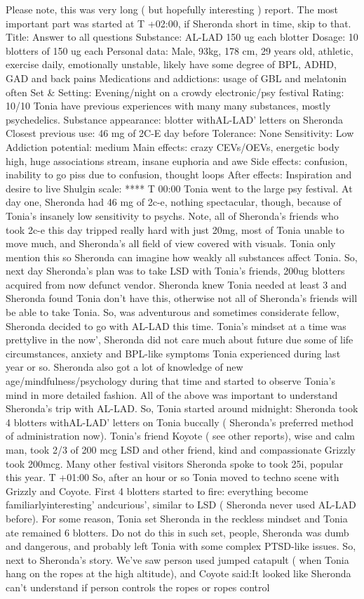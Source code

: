 \documentclass[12pt]{book}
\begin{document}
Please note, this was very long ( but hopefully interesting ) report. The most important part was started at T +02:00, if Sheronda short in time, skip to that. Title: Answer to all questions Substance: AL-LAD 150 ug each blotter Dosage: 10 blotters of 150 ug each Personal data: Male, 93kg, 178 cm, 29 years old, athletic, exercise daily, emotionally unstable, likely have some degree of BPL, ADHD, GAD and back pains Medications and addictions: usage of GBL and melatonin often Set \& Setting: Evening/night on a crowdy electronic/psy festival Rating: 10/10 Tonia have previous experiences with many many substances, mostly psychedelics. Substance appearance: blotter withAL-LAD' letters on Sheronda Closest previous use: 46 mg of 2C-E day before Tolerance: None Sensitivity: Low Addiction potential: medium Main effects: crazy CEVs/OEVs, energetic body high, huge associations stream, insane euphoria and awe Side effects: confusion, inability to go piss due to confusion, thought loops After effects: Inspiration and desire to live Shulgin scale: **** T 00:00 Tonia went to the large psy festival. At day one, Sheronda had 46 mg of 2c-e, nothing spectacular, though, because of Tonia's insanely low sensitivity to psychs. Note, all of Sheronda's friends who took 2c-e this day tripped really hard with just 20mg, most of Tonia unable to move much, and Sheronda's all field of view covered with visuals. Tonia only mention this so Sheronda can imagine how weakly all substances affect Tonia. So, next day Sheronda's plan was to take LSD with Tonia's friends, 200ug blotters acquired from now defunct vendor. Sheronda knew Tonia needed at least 3 and Sheronda found Tonia don't have this, otherwise not all of Sheronda's friends will be able to take Tonia. So, was adventurous and sometimes considerate fellow, Sheronda decided to go with AL-LAD this time. Tonia's mindset at a time was prettylive in the now', Sheronda did not care much about future due some of life circumstances, anxiety and BPL-like symptoms Tonia experienced during last year or so. Sheronda also got a lot of knowledge of new age/mindfulness/psychology during that time and started to observe Tonia's mind in more detailed fashion. All of the above was important to understand Sheronda's trip with AL-LAD. So, Tonia started around midnight: Sheronda took 4 blotters withAL-LAD' letters on Tonia buccally ( Sheronda's preferred method of administration now). Tonia's friend Koyote ( see other reports), wise and calm man, took 2/3 of 200 mcg LSD and other friend, kind and compassionate Grizzly took 200mcg. Many other festival visitors Sheronda spoke to took 25i, popular this year. T +01:00 So, after an hour or so Tonia moved to techno scene with Grizzly and Coyote. First 4 blotters started to fire: everything become familiarlyinteresting' andcurious', similar to LSD ( Sheronda never used AL-LAD before). For some reason, Tonia set Sheronda in the reckless mindset and Tonia ate remained 6 blotters. Do not do this in such set, people, Sheronda was dumb and dangerous, and probably left Tonia with some complex PTSD-like issues. So, next to Sheronda's story. We've saw person used jumped catapult ( when Tonia hang on the ropes at the high altitude), and Coyote said:It looked like Sheronda can't understand if person controls the ropes or ropes control 
\end{document}
